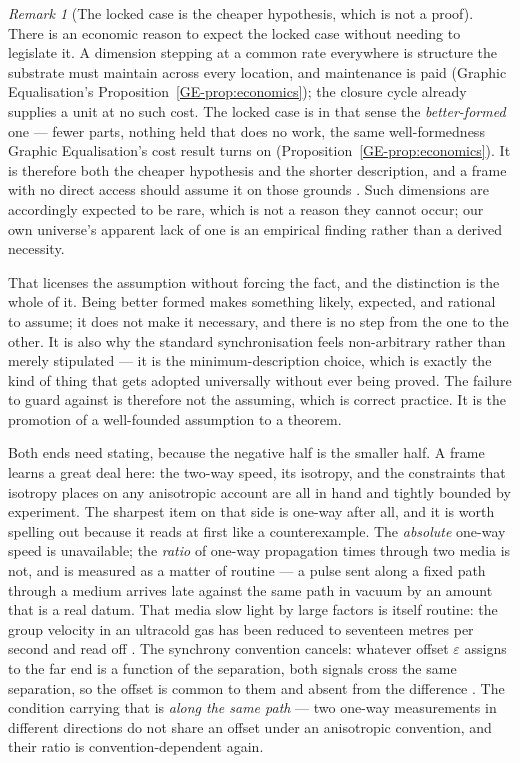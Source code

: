 \documentclass[11pt,a4paper]{article}
\theoremstyle{remark}\newtheorem{remark}[definition]{Remark}
\begin{document}
\begin{remark}[The locked case is the cheaper hypothesis, which is not a proof]\label{rem:locked-cheaper}
There is an economic reason to expect the locked case without needing to legislate it. A dimension
stepping at a common rate everywhere is structure the substrate must maintain across every location,
and maintenance is paid (Graphic Equalisation's Proposition~\ref{GE-prop:economics}); the closure cycle already supplies a
unit at no such cost. The locked case is in that sense the \emph{better-formed} one --- fewer parts,
nothing held that does no work, the same well-formedness Graphic Equalisation's cost result turns on
(Proposition~\ref{GE-prop:economics}).
It is therefore both the cheaper hypothesis and the shorter description, and a frame with no direct
access should assume it on those grounds \citep{rissanen1978}. Such dimensions are accordingly
expected to be rare, which is not a reason they cannot occur; our own universe's apparent lack of one
is an empirical finding rather than a derived necessity.

That licenses the assumption without forcing the fact, and the distinction is the whole of it. Being
better formed makes something likely, expected, and rational to assume; it does not make it
necessary, and there is no step from the one to the other. It is also why the standard
synchronisation feels non-arbitrary rather than merely stipulated --- it is the minimum-description
choice, which is exactly the kind of thing that gets adopted universally without ever being proved.
The failure to guard against is therefore not the assuming, which is correct practice. It is the
promotion of a well-founded assumption to a theorem.
\end{remark}

Both ends need stating, because the negative half is the smaller half. A frame learns a great deal
here: the two-way speed, its isotropy, and the constraints that isotropy places on any anisotropic
account are all in hand and tightly bounded by experiment. The sharpest item on that side is one-way
after all, and it is worth spelling out because it reads at first like a counterexample. The
\emph{absolute} one-way speed is unavailable; the \emph{ratio} of one-way propagation times through two media is
not, and is measured as a matter of routine --- a pulse sent along a fixed path through a medium
arrives late against the same path in vacuum by an amount that is a real datum. That media slow light
by large factors is itself routine: the group velocity in an ultracold gas has been reduced to
seventeen metres per second and read off \citep{hau1999}. The synchrony convention cancels: whatever
offset $\varepsilon$ assigns to the far end is a function of the separation, both signals cross the
same separation, so the offset is common to them and absent from the difference
\citep{anderson1998}. The condition carrying that is \emph{along the same path} --- two one-way
measurements in different directions do not share an offset under an anisotropic convention, and
their ratio is convention-dependent again.
\end{document}
